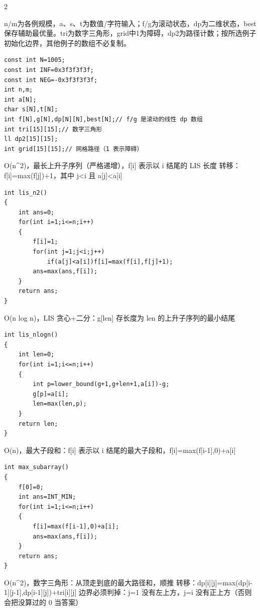 \documentclass[UTF8,fontset=fandol,a4paper,twoside]{ctexart}
\newcommand{\note}[1]{{\fontsize{10}{12}\selectfont #1\par}}
\begin{document}
\begin{multicols}{2}
\note{n/\allowbreak{}m为各例规模，a、s、t为数值/\allowbreak{}字符输入；f/\allowbreak{}g为滚动状态，dp为二维状态，best保存辅助最优量。tri为数字三角形，grid中1为障碍，dp2为路径计数；按所选例子初始化边界，其他例子的数组不必复制。}
\begin{lstlisting}
const int N=1005;
const int INF=0x3f3f3f3f;
const int NEG=-0x3f3f3f3f;
int n,m;
int a[N];
char s[N],t[N];
int f[N],g[N],dp[N][N],best[N];// f/g 是滚动的线性 dp 数组
int tri[15][15];// 数字三角形
ll dp2[15][15];
int grid[15][15];// 网格路径（1 表示障碍）
\end{lstlisting}
\note{O(\allowbreak{}n\textasciicircum{}2)\allowbreak{}，最长上升子序列（严格递增），f[\allowbreak{}i]\allowbreak{} 表示以 i 结尾的 LIS 长度 转移：f[\allowbreak{}i]\allowbreak{}=\allowbreak{}max(\allowbreak{}f[\allowbreak{}j]\allowbreak{})\allowbreak{}+\allowbreak{}1，其中 j<\allowbreak{}i 且 a[\allowbreak{}j]\allowbreak{}<\allowbreak{}a[\allowbreak{}i]\allowbreak{}}
\begin{lstlisting}
int lis_n2()
{
    int ans=0;
    for(int i=1;i<=n;i++)
    {
        f[i]=1;
        for(int j=1;j<i;j++)
            if(a[j]<a[i])f[i]=max(f[i],f[j]+1);
        ans=max(ans,f[i]);
    }
    return ans;
}
\end{lstlisting}
\note{O(\allowbreak{}n log n)\allowbreak{}，LIS 贪心+\allowbreak{}二分：g[\allowbreak{}len]\allowbreak{} 存长度为 len 的上升子序列的最小结尾}
\begin{lstlisting}
int lis_nlogn()
{
    int len=0;
    for(int i=1;i<=n;i++)
    {
        int p=lower_bound(g+1,g+len+1,a[i])-g;
        g[p]=a[i];
        len=max(len,p);
    }
    return len;
}
\end{lstlisting}
\note{O(\allowbreak{}n)\allowbreak{}，最大子段和：f[\allowbreak{}i]\allowbreak{} 表示以 i 结尾的最大子段和，f[\allowbreak{}i]\allowbreak{}=\allowbreak{}max(\allowbreak{}f[\allowbreak{}i-\allowbreak{}1]\allowbreak{},\allowbreak{}0)\allowbreak{}+\allowbreak{}a[\allowbreak{}i]\allowbreak{}}
\begin{lstlisting}
int max_subarray()
{
    f[0]=0;
    int ans=INT_MIN;
    for(int i=1;i<=n;i++)
    {
        f[i]=max(f[i-1],0)+a[i];
        ans=max(ans,f[i]);
    }
    return ans;
}
\end{lstlisting}
\note{O(\allowbreak{}n\textasciicircum{}2)\allowbreak{}，数字三角形：从顶走到底的最大路径和，顺推 转移：dp[\allowbreak{}i]\allowbreak{}[\allowbreak{}j]\allowbreak{}=\allowbreak{}max(\allowbreak{}dp[\allowbreak{}i-\allowbreak{}1]\allowbreak{}[\allowbreak{}j-\allowbreak{}1]\allowbreak{},\allowbreak{}dp[\allowbreak{}i-\allowbreak{}1]\allowbreak{}[\allowbreak{}j]\allowbreak{})\allowbreak{}+\allowbreak{}tri[\allowbreak{}i]\allowbreak{}[\allowbreak{}j]\allowbreak{} 边界必须判掉：j=\allowbreak{}1 没有左上方，j=\allowbreak{}i 没有正上方（否则会把没算过的 0 当答案）}

\end{multicols}
\end{document}
